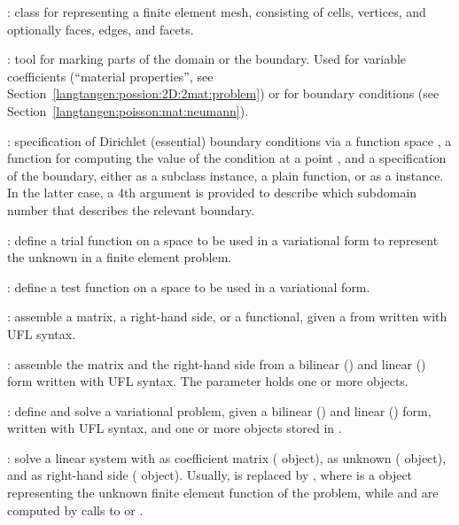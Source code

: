 \begin{trivlist}
  \item[\emp{Mesh}:] class for representing a finite element mesh,
  consisting of cells, vertices, and optionally faces, edges, and facets.

  \item[\emp{MeshFunction}:] tool for marking parts of the domain or
  the boundary.  Used for variable coefficients (``material properties'',
  see Section~\ref{langtangen:possion:2D:2mat:problem}) or for boundary
  conditions (see Section~\ref{langtangen:poisson:mat:neumann}).

  \item[\emp{DirichletBC(V, value, where)}:] specification of Dirichlet
  (essential) boundary conditions via a function space , a
  function  for computing the value of the condition at
  a point , and a specification  of the boundary,
  either as a  subclass instance, a plain function, or
  as a  instance.  In the latter case, a 4th argument
  is provided to describe which subdomain number that describes the
  relevant boundary.

  \item[\emp{TrialFunction(V)}:] define a trial function on a space
   to be used in a variational form to represent the unknown in
  a finite element problem.

  \item[\emp{TestFunction(V)}:] define a test function on a space 
  to be used in a variational form.

  \item[\emp{assemble(X)}:] assemble a matrix, a right-hand side, or a
  functional, given a from  written with UFL syntax.

  \item[\emp{assemble\_system(a, L, bc)}:] assemble the matrix and the
  right-hand side from a bilinear () and linear () form
  written with UFL syntax. The  parameter holds one or more
   objects.

  \item[\emp{VariationalProblem(a, L, bc)}:] define and solve a
  variational problem, given a bilinear () and linear ()
  form, written with UFL syntax, and one or more 
  objects stored in .

  \item[\emp{solve(A, U, b)}:] solve a linear system with 
  as coefficient matrix ( object),  as unknown
  ( object), and  as right-hand side (
  object).  Usually,  is replaced by , where
   is a  object representing the unknown finite
  element function of the problem, while  and  are computed
  by calls to  or .


\end{trivlist}
